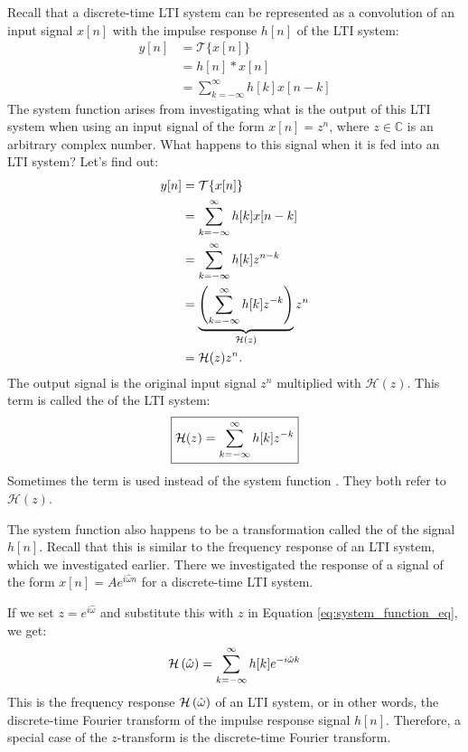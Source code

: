 Recall that a discrete-time LTI system can be represented as a
convolution of an input signal $x[n]$ with the impulse response $h[n]$
of the LTI system:
\begin{align}
y[n] &= \mathcal{T}\{x[n]\}\\
    &= h[n]*x[n]\\
     &= \sum_{k=-\infty}^{\infty} h[k] x[n-k]
\end{align}
The system function arises from investigating what is the output of
this LTI system when using an input signal of the form $x[n]=z^n$,
where $z\in \mathbb{C}$ is an arbitrary complex number. What happens
to this signal when it is fed into an LTI system? Let's find out:
\begin{align}
y[n] &= \mathcal{T}\{x[n]\}\\
     &= \sum_{k=-\infty}^{\infty} h[k] x[n-k]\\
     &= \sum_{k=-\infty}^{\infty} h[k] z^{n-k}\\
     &= \underbrace{\left(\sum_{k=-\infty}^{\infty} h[k] z^{-k}\right)}_{\mathcal{H}(z)} z^n \\
     &= \mathcal{H}(z) z^n.
\end{align}
The output signal is the original input signal $z^n$ multiplied with $\mathcal{H}(z)$. This term is called the \emph{} of the LTI system:
\begin{equation}
\boxed{
\mathcal{H}(z) = \sum_{k=-\infty}^{\infty} h[k] z^{-k}
}
\label{eq:system_function_eq}
\end{equation}
Sometimes the term \emph{}
is used instead of the system function . 
They both refer to $\mathcal{H}(z)$. 

The system function also happens to be a transformation called
the \emph{} of the signal $h[n]$. Recall
that this is similar to the frequency response of an LTI system, which
we investigated earlier. There we investigated the response of a
signal of the form $x[n]=A e^{i\hat{\omega}n}$ for a discrete-time LTI
system.

If we set $z = e^{i\hat{\omega}}$ and substitute this with $z$ in
Equation \ref{eq:system_function_eq}, we get:
\begin{equation}
\mathcal{H}\left(\hat{\omega}\right) = \sum_{k=-\infty}^{\infty} h[k] e^{-i\hat{\omega}k}
\end{equation}
This is the frequency response $\mathcal{H}\left(\hat{\omega}\right)$ of an LTI system, or in other
words, the discrete-time Fourier transform of the impulse response
signal $h[n]$. Therefore, a special case of the $z$-transform is the
discrete-time Fourier transform.

